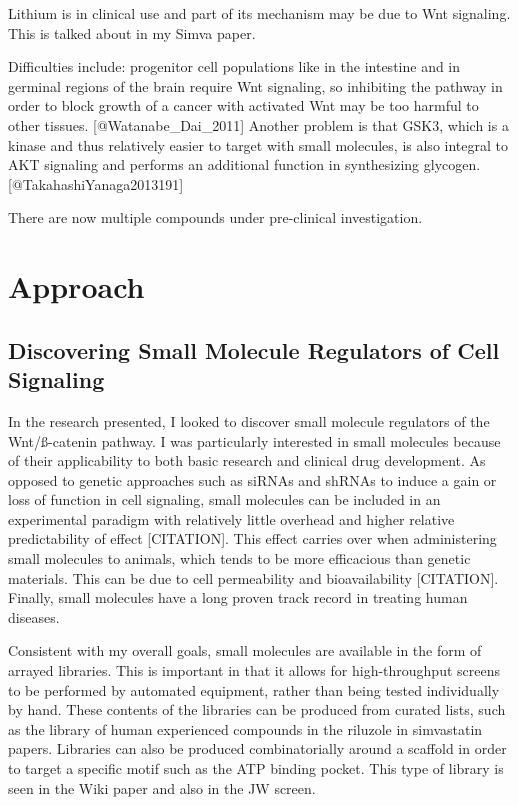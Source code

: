 Lithium is in clinical use and part of its mechanism may be due to Wnt signaling. This is talked about in my Simva paper.

Difficulties include: progenitor cell populations like in the intestine and in germinal regions of the brain require Wnt signaling, so inhibiting the pathway in order to block growth of a cancer with activated Wnt may be too harmful to other tissues. [@Watanabe_Dai_2011] Another problem is that GSK3, which is a kinase and thus relatively easier to target with small molecules, is also integral to AKT signaling and performs an additional function in synthesizing glycogen. [@TakahashiYanaga2013191]

There are now multiple compounds under pre-clinical investigation.


\section{Approach}


\subsection{Discovering Small Molecule Regulators of Cell Signaling}

In the research presented, I looked to discover small molecule regulators of the Wnt/ß-catenin pathway. I was particularly interested in small molecules because of their applicability to both basic research and clinical drug development. As opposed to genetic approaches such as siRNAs and shRNAs to induce a gain or loss of function in cell signaling, small molecules can be included in an experimental paradigm with relatively little overhead and higher relative predictability of effect [CITATION]. This effect carries over when administering small molecules to animals, which tends to be more efficacious than genetic materials. This can be due to cell permeability and bioavailability [CITATION]. Finally, small molecules have a long proven track record in treating human diseases.

Consistent with my overall goals, small molecules are available in the form of arrayed libraries. This is important in that it allows for high-throughput screens to be performed by automated equipment, rather than being tested individually by hand. These contents of the libraries can be produced from curated lists, such as the library of human experienced compounds in the riluzole in simvastatin papers. Libraries can also be produced combinatorially around a scaffold in order to target a specific motif such as the ATP binding pocket. This type of library is seen in the Wiki paper and also in the JW screen.


